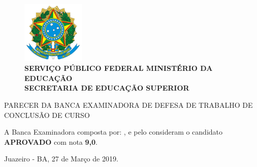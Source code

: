 \newpage

\vspace*{-2.5cm}

\begin{figure}[!htbp]
 	\centering
 	\includegraphics[width=3cm]{./figuras/brasao.pdf}\\
 	\small{\textbf{SERVIÇO PÚBLICO FEDERAL MINISTÉRIO DA EDUCAÇÃO}}\\
	\textbf{SECRETARIA DE EDUCAÇÃO SUPERIOR}
\end{figure}

\begin{center}
    \ABNTEXchapterfont {\textbf {\MakeUppercase{\universidade}\\ \MakeUppercase{\graduacao} }}
\end{center}

\vspace{1cm}

\begin{center}
    \MakeUppercase{Parecer da banca examinadora de defesa de trabalho de conclusão de curso}
\end{center}

\vspace{1cm}

\begin{center}
    \emph{\Large\imprimirautor}
\end{center}


\noindent A Banca Examinadora composta por: \emph{\imprimirorientador}, \emph{\bancaum} e pelo \emph{\bancadois} consideram o candidato \textbf{APROVADO} com nota \textbf{9,0}.

\vspace{1cm}

\begin{center}
    Juazeiro - BA, 27 de Março de 2019.
\end{center}

